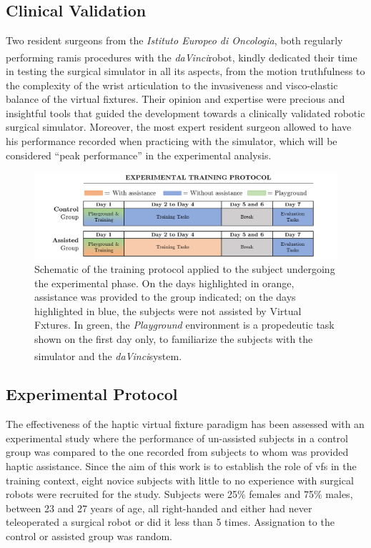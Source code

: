 \documentclass{article}
\newcommand{\cright}{\textsuperscript{\textregistered}\phantom{..}}
\begin{document}
\begin{multicols}{2}
\subsection{Clinical Validation}
Two resident surgeons from the \textit{Istituto Europeo di Oncologia}, both regularly performing \ac{ramis} procedures with the \textit{daVinci}\cright robot, kindly dedicated their time in testing the surgical simulator in all its aspects, from the motion truthfulness to the complexity of the wrist articulation to the invasiveness and visco-elastic balance of the virtual fixtures. Their opinion and expertise were precious and insightful tools that guided the development towards a clinically validated robotic surgical simulator. 
Moreover, the most expert resident surgeon allowed to have his performance recorded when practicing with the simulator, which will be considered ``peak performance'' in the experimental analysis. 
\begin{figure}
  \centering
      \includegraphics[width=\linewidth]{images/training_protocol.png}
      \caption{Schematic of the training protocol applied to the subject undergoing the experimental phase. On the days highlighted in orange,  assistance was provided to the group indicated; on the days highlighted in blue, the subjects were not assisted by Virtual Fxtures. In green, the \textit{Playground} environment is a propedeutic task shown on the first day only, to familiarize the subjects with the simulator and the \textit{daVinci}\cright system.}
      \label{fig:training_protocol}
\end{figure}
\subsection{Experimental Protocol}
The effectiveness of the haptic virtual fixture paradigm has been assessed with an experimental study where the performance of un-assisted subjects in a control group was compared to the one recorded from subjects to whom was provided haptic assistance. Since the aim of this work is to establish the role of \acp{vf} in the training context, eight novice subjects with little to no experience with surgical robots were recruited for the study. Subjects were 25\% females and 75\% males, between 23 and 27 years of age, all right-handed and either had never teleoperated a surgical robot or did it less than 5 times. Assignation to the control or assisted group was random.


\end{multicols}
\end{document}

